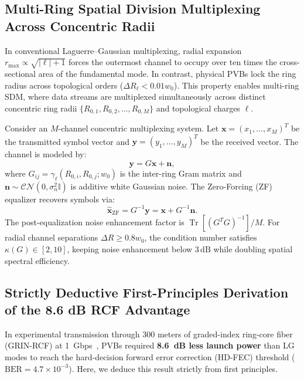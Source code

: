 \documentclass{optica-article}
\begin{document}
\subsection{Multi-Ring Spatial Division Multiplexing Across Concentric Radii}

In conventional Laguerre--Gaussian multiplexing, radial expansion $r_{\max} \propto \sqrt{|\ell| + 1}$ forces the outermost channel to occupy over ten times the cross-sectional area of the fundamental mode. In contrast, physical PVBs lock the ring radius across topological orders ($\Delta R_\ell < 0.01 w_0$). This property enables multi-ring SDM, where data streams are multiplexed simultaneously across distinct concentric ring radii $\{R_{0, 1}, R_{0, 2}, \dots, R_{0, M}\}$ and topological charges $\ell$.

Consider an $M$-channel concentric multiplexing system. Let $\mathbf{x} = (x_1, \dots, x_M)^T$ be the transmitted symbol vector and $\mathbf{y} = (y_1, \dots, y_M)^T$ be the received vector. The channel is modeled by:
\begin{equation}
\mathbf{y} = G \mathbf{x} + \mathbf{n},
\label{eq:channel_model}
\end{equation}
where $G_{ij} = \gamma_\ell(R_{0, i}, R_{0, j}; w_0)$ is the inter-ring Gram matrix and $\mathbf{n} \sim \mathcal{CN}(0, \sigma_n^2 \mathbb{I})$ is additive white Gaussian noise. The Zero-Forcing (ZF) equalizer recovers symbols via:
\begin{equation}
\hat{\mathbf{x}}_{\text{ZF}} = G^{-1} \mathbf{y} = \mathbf{x} + G^{-1} \mathbf{n}.
\label{eq:zf_equalizer}
\end{equation}
The post-equalization noise enhancement factor is $\operatorname{Tr}[(G^T G)^{-1}] / M$. For radial channel separations $\Delta R \ge 0.8 w_0$, the condition number satisfies $\kappa(G) \in [2, 10]$, keeping noise enhancement below $3\,\text{dB}$ while doubling spatial spectral efficiency.

\subsection{Strictly Deductive First-Principles Derivation of the 8.6 dB RCF Advantage}

In experimental transmission through 300 meters of graded-index ring-core fiber (GRIN-RCF) at 1~Gbps~\cite{Villalba2023}, PVBs required \textbf{8.6~dB less launch power} than LG modes to reach the hard-decision forward error correction (HD-FEC) threshold ($\text{BER} = 4.7 \times 10^{-3}$). Here, we deduce this result strictly from first principles.
\end{document}
